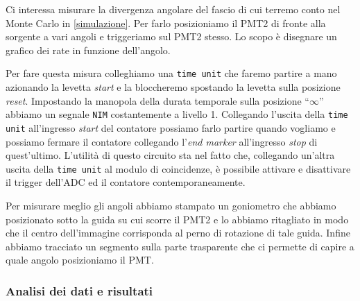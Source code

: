Ci interessa misurare la divergenza angolare del fascio di cui terremo conto nel Monte Carlo in \autoref{simulazione}.
Per farlo posizioniamo il PMT2 di fronte alla sorgente a vari angoli e triggeriamo sul PMT2 stesso. Lo scopo è disegnare un grafico dei rate in funzione dell'angolo.

Per fare questa misura colleghiamo una \texttt{time unit} che faremo partire a mano azionando la levetta \emph{start} e la bloccheremo spostando la levetta sulla posizione \emph{reset}. Impostando la manopola della durata temporale sulla posizione ``$\infty$'' abbiamo un segnale \texttt{NIM} costantemente a livello 1. Collegando l'uscita della \texttt{time unit} all'ingresso \emph{start} del contatore possiamo farlo partire quando vogliamo e possiamo fermare il contatore collegando l'\emph{end marker} all'ingresso \emph{stop} di quest'ultimo. 
L'utilità di questo circuito sta nel fatto che, collegando un'altra uscita della \texttt{time unit} al modulo di coincidenze, è possibile attivare e disattivare il trigger dell'ADC ed il contatore contemporaneamente.

Per misurare meglio gli angoli abbiamo stampato un goniometro che abbiamo posizionato sotto la guida su cui scorre il PMT2 e lo abbiamo ritagliato in modo che il centro dell'immagine corrisponda al perno di rotazione di tale guida. Infine abbiamo tracciato un segmento sulla parte trasparente che ci permette di capire a quale angolo posizioniamo il PMT.

\subsubsection{Analisi dei dati e risultati}





